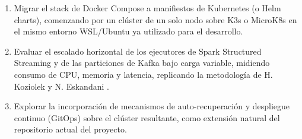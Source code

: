 \begin{enumerate}
    \item Migrar el stack de Docker Compose a manifiestos de Kubernetes (o Helm charts), comenzando por un clúster de un solo nodo sobre K3s o MicroK8s en el mismo entorno WSL/Ubuntu ya utilizado para el desarrollo.
    \item Evaluar el escalado horizontal de los ejecutores de Spark Structured Streaming y de las particiones de Kafka bajo carga variable, midiendo consumo de CPU, memoria y latencia, replicando la metodología de H. Koziolek y N. Eskandani \cite{koziolek2023}.
    \item Explorar la incorporación de mecanismos de auto-recuperación y despliegue continuo (GitOps) sobre el clúster resultante, como extensión natural del repositorio actual del proyecto.
\end{enumerate}
